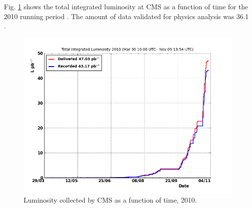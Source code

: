 Fig. \ref{fig:LuminosityVsTime} shows the total integrated luminosity at CMS 
as a function of time for the 2010 running period \cite{LumiPublicResults2010}.  
The amount of data validated for physics analysis was 
36.1 \pb.  

 \begin{figure}[htb]
  \begin{center}
    \includegraphics[width=360pt]{Figures/totallumivstime2010.png}
  \end{center}
  \caption[\fixspacing Luminosity collected by CMS as a function of time, 2010]
	  {\fixspacing Luminosity collected by CMS as a function of time, 2010.}
  \label{fig:LuminosityVsTime}
 \end{figure}


